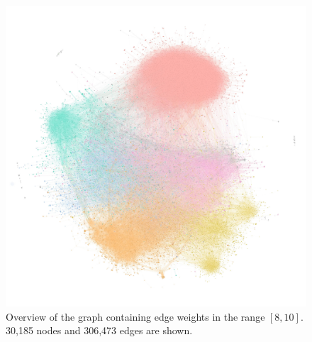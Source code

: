 \begin{figure}[H]
    \centering
    \includegraphics[width=\linewidth, trim=1cm 4.8cm 0.5cm 3.2cm, clip]{assets/big view-min-min.jpg}
    \caption{Overview of the graph containing edge weights in the range $[8,10]$. 30,185 nodes and 306,473 edges are shown.}
    \label{fig:big-view}
\end{figure}




